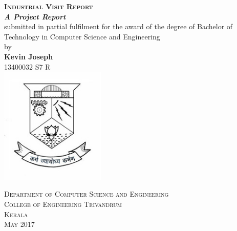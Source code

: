 \documentclass[a4paper,12pt]{report}
\begin{document}
	\begin{titlepage}
		\begin{centering}
		 
		
		\textsc{\textbf{\LARGE{Industrial Visit Report}}}\\[0.5cm]

		\textbf{\textit{\large{A Project Report}}}\\[1.5cm]

		\large{submitted in partial fulfilment for the award of the degree of Bachelor of Technology in Computer Science and Engineering}\\[1.5cm]

		\large{by}\\[0.5cm]

		\textbf{Kevin Joseph     }\\
		{13400032 S7 R}\\[2cm]
		

		\includegraphics[width=5cm]{images/logo.jpg}

		\textsc{Department of Computer Science and Engineering}\\
		\textsc{College of Engineering Trivandrum}\\
		\textsc{Kerala}\\[0.5cm]
		\textsc{May 2017}\\
		\vfill %
		\end{centering}
	\end{titlepage}
\end{document}
